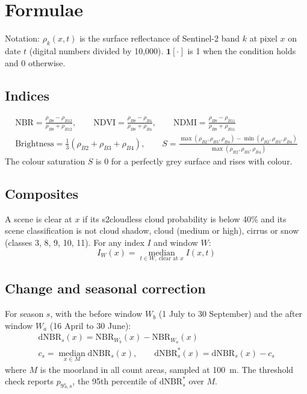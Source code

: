 \documentclass[11pt,a4paper]{article}
\begin{document}
\section{Formulae}\label{app:formulae}

Notation: $\rho_k(x,t)$ is the surface reflectance of Sentinel-2 band $k$ at pixel $x$ on date $t$ (digital numbers divided by 10,000). $\mathbf{1}[\cdot]$ is 1 when the condition holds and 0 otherwise.

\subsection{Indices}
\begin{gather*}
\mathrm{NBR} = \frac{\rho_{B8}-\rho_{B12}}{\rho_{B8}+\rho_{B12}}, \qquad \mathrm{NDVI} = \frac{\rho_{B8}-\rho_{B4}}{\rho_{B8}+\rho_{B4}}, \qquad \mathrm{NDMI} = \frac{\rho_{B8}-\rho_{B11}}{\rho_{B8}+\rho_{B11}} \\[4pt]
\text{Brightness} = \tfrac{1}{3}\left(\rho_{B2}+\rho_{B3}+\rho_{B4}\right), \qquad S = \frac{\max(\rho_{B2},\rho_{B3},\rho_{B4})-\min(\rho_{B2},\rho_{B3},\rho_{B4})}{\max(\rho_{B2},\rho_{B3},\rho_{B4})}
\end{gather*}
The colour saturation $S$ is 0 for a perfectly grey surface and rises with colour.

\subsection{Composites}
A scene is clear at $x$ if its s2cloudless cloud probability is below 40\% and its scene classification is not cloud shadow, cloud (medium or high), cirrus or snow (classes 3, 8, 9, 10, 11). For any index $I$ and window $W$:
\[
I_W(x) = \operatorname*{median}_{t \in W,\ \text{clear at } x} I(x,t)
\]

\subsection{Change and seasonal correction}
For season $s$, with the before window $W_b$ (1 July to 30 September) and the after window $W_a$ (16 April to 30 June):
\begin{gather*}
\mathrm{dNBR}_s(x) = \mathrm{NBR}_{W_b}(x) - \mathrm{NBR}_{W_a}(x) \\
c_s = \operatorname*{median}_{x \in M} \mathrm{dNBR}_s(x), \qquad \mathrm{dNBR}^{*}_s(x) = \mathrm{dNBR}_s(x) - c_s
\end{gather*}
where $M$ is the moorland in all count areas, sampled at 100~m. The threshold check reports $p_{95,s}$, the 95th percentile of $\mathrm{dNBR}^{*}_s$ over $M$.
\end{document}
